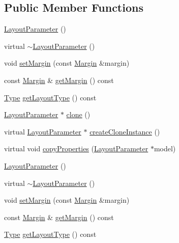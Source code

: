 \subsection*{Public Member Functions}
\begin{DoxyCompactItemize}
\item 
\hyperlink{classui_1_1LayoutParameter_a57def756bbcfaeda457a1ebd2149582c}{Layout\+Parameter} ()
\item 
virtual \hyperlink{classui_1_1LayoutParameter_a7892278bef91cf0e24c5c2743ace8ae7}{$\sim$\+Layout\+Parameter} ()
\item 
void \hyperlink{classui_1_1LayoutParameter_a0e0d2968dee143c8545365a12e45e586}{set\+Margin} (const \hyperlink{classui_1_1Margin}{Margin} \&margin)
\item 
const \hyperlink{classui_1_1Margin}{Margin} \& \hyperlink{classui_1_1LayoutParameter_a73e27e60494106c1629f22f868c7be27}{get\+Margin} () const
\item 
\hyperlink{classui_1_1LayoutParameter_a1b01e01e7e6fc3de80f2e6d07fae806e}{Type} \hyperlink{classui_1_1LayoutParameter_a4dbf300e13a753cd035cc3f45b099400}{get\+Layout\+Type} () const
\item 
\hyperlink{classui_1_1LayoutParameter}{Layout\+Parameter} $\ast$ \hyperlink{classui_1_1LayoutParameter_add4261a5b99cda5ccfef214ef78b3e2b}{clone} ()
\item 
virtual \hyperlink{classui_1_1LayoutParameter}{Layout\+Parameter} $\ast$ \hyperlink{classui_1_1LayoutParameter_a6ca908e0dd4f85238894b28d5d816974}{create\+Clone\+Instance} ()
\item 
virtual void \hyperlink{classui_1_1LayoutParameter_af4c1b163c31ac6244902610334ead73f}{copy\+Properties} (\hyperlink{classui_1_1LayoutParameter}{Layout\+Parameter} $\ast$model)
\item 
\hyperlink{classui_1_1LayoutParameter_a57def756bbcfaeda457a1ebd2149582c}{Layout\+Parameter} ()
\item 
virtual \hyperlink{classui_1_1LayoutParameter_a7892278bef91cf0e24c5c2743ace8ae7}{$\sim$\+Layout\+Parameter} ()
\item 
void \hyperlink{classui_1_1LayoutParameter_a0e0d2968dee143c8545365a12e45e586}{set\+Margin} (const \hyperlink{classui_1_1Margin}{Margin} \&margin)
\item 
const \hyperlink{classui_1_1Margin}{Margin} \& \hyperlink{classui_1_1LayoutParameter_abeb9f29a89baa815f61107667a02b501}{get\+Margin} () const
\item 
\hyperlink{classui_1_1LayoutParameter_a1b01e01e7e6fc3de80f2e6d07fae806e}{Type} \hyperlink{classui_1_1LayoutParameter_ae94866a7e51a7fcc9ded78f511c8da96}{get\+Layout\+Type} () const

\end{DoxyCompactItemize}
